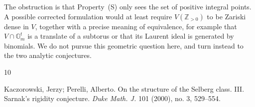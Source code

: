\documentclass[12pt,reqno]{amsart}
\numberwithin{equation}{section}
\theoremstyle{plain}
\theoremstyle{definition}
\theoremstyle{remark}
\begin{document}
The obstruction is that Property~(S) only sees the set of positive integral points. A possible corrected formulation would at least require \(V(\mathbb{Z}_{>0})\) to be Zariski dense in \(V\), together with a precise meaning of equivalence, for example that \(V\cap\mathbb{G}_m^t\) is a translate of a subtorus or that its Laurent ideal is generated by binomials. We do not pursue this geometric question here, and turn instead to the two analytic conjectures.


\begin{thebibliography}{10}

Kaczorowski, Jerzy; Perelli, Alberto.
On the structure of the Selberg class. III. Sarnak's rigidity conjecture.
\emph{Duke Math. J.} 101 (2000), no. 3, 529--554.

\end{thebibliography}
\end{document}
